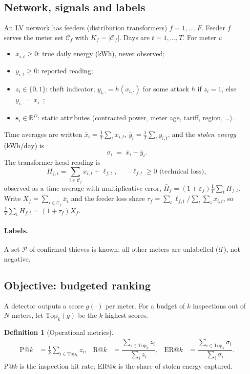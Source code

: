 \documentclass[11pt,a4paper]{article}
\theoremstyle{plain}
\theoremstyle{definition}
\newtheorem{definition}{Definition}
\theoremstyle{remark}
\newcommand{\R}{\mathbb{R}}
\begin{document}
\subsection{Network, signals and labels}
An LV network has feeders (distribution transformers) $f=1,\dots,F$. Feeder $f$ serves the meter set $\mathcal C_f$ with $K_f=|\mathcal C_f|$. Days are $t=1,\dots,T$. For meter $i$:
\begin{itemize}
\item $x_{i,t}\ge 0$: true daily energy (kWh), never observed;
\item $y_{i,t}\ge 0$: reported reading;
\item $z_i\in\{0,1\}$: theft indicator; $y_{i,\cdot}=h(x_{i,\cdot})$ for some attack $h$ if $z_i=1$, else $y_{i,\cdot}=x_{i,\cdot}$;
\item $\bm s_i\in\R^{D}$: static attributes (contracted power, meter age, tariff, region, \dots).
\end{itemize}
Time averages are written $\bar x_i=\tfrac1T\sum_t x_{i,t}$, $\bar y_i=\tfrac1T\sum_t y_{i,t}$, and the \emph{stolen energy} (kWh/day) is
\begin{equation}
\sigma_i \;=\; \bar x_i-\bar y_i .
\label{eq:sigma}
\end{equation}
The transformer head reading is
\begin{equation}
H_{f,t}=\sum_{i\in\mathcal C_f}x_{i,t}+\ell_{f,t},
\qquad \ell_{f,t}\ge 0 \text{ (technical loss)},
\label{eq:head}
\end{equation}
observed as a time average with multiplicative error, $\bar H_f=(1+\varepsilon_f)\tfrac1T\sum_t H_{f,t}$. Write $X_f=\sum_{i\in\mathcal C_f}\bar x_i$ and the feeder loss share $\tau_f=\sum_t\ell_{f,t}/\sum_t\sum_i x_{i,t}$, so $\tfrac1T\sum_tH_{f,t}=(1+\tau_f)X_f$.

\paragraph{Labels.} A set $\mathcal P$ of confirmed thieves is known; all other meters are unlabelled ($\mathcal U$), not negative.

\subsection{Objective: budgeted ranking}
A detector outputs a score $g(\cdot)$ per meter. For a budget of $k$ inspections out of $N$ meters, let $\mathrm{Top}_k(g)$ be the $k$ highest scores.
\begin{definition}[Operational metrics]
\begin{align}
\mathrm{P@}k&=\tfrac1k\textstyle\sum_{i\in \mathrm{Top}_k}z_i, &
\mathrm{R@}k&=\dfrac{\sum_{i\in \mathrm{Top}_k}z_i}{\sum_i z_i}, &
\mathrm{ER@}k&=\dfrac{\sum_{i\in \mathrm{Top}_k}\sigma_i}{\sum_i \sigma_i}.
\end{align}
P@$k$ is the inspection hit rate; ER@$k$ is the share of stolen energy captured.
\end{definition}
\end{document}
